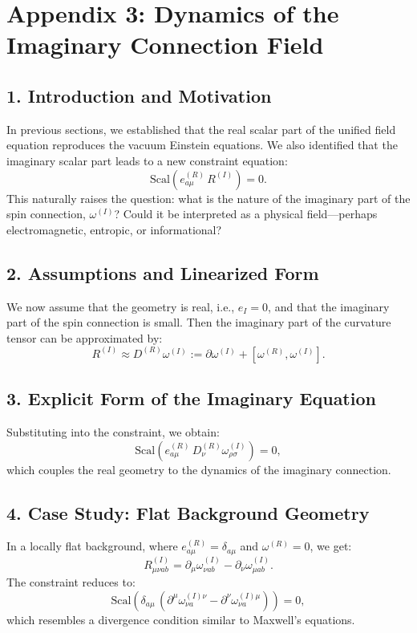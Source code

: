 
\section*{Appendix 3: Dynamics of the Imaginary Connection Field}

\subsection*{1. Introduction and Motivation}

In previous sections, we established that the real scalar part of the unified field equation reproduces the vacuum Einstein equations. We also identified that the imaginary scalar part leads to a new constraint equation:
\[
\text{Scal}\left(e^{(R)}_{a\mu} \, R^{(I)}\right) = 0.
\]
This naturally raises the question: what is the nature of the imaginary part of the spin connection, $\omega^{(I)}$? Could it be interpreted as a physical field—perhaps electromagnetic, entropic, or informational?

\subsection*{2. Assumptions and Linearized Form}

We now assume that the geometry is real, i.e., $e_I = 0$, and that the imaginary part of the spin connection is small. Then the imaginary part of the curvature tensor can be approximated by:
\[
R^{(I)} \approx D^{(R)} \omega^{(I)} := \partial \omega^{(I)} + [\omega^{(R)}, \omega^{(I)}].
\]

\subsection*{3. Explicit Form of the Imaginary Equation}

Substituting into the constraint, we obtain:
\[
\text{Scal}\left(e^{(R)}_{a\mu} \, D^{(R)}_\nu \omega^{(I)}_{\rho\sigma}\right) = 0,
\]
which couples the real geometry to the dynamics of the imaginary connection.

\subsection*{4. Case Study: Flat Background Geometry}

In a locally flat background, where $e^{(R)}_{a\mu} = \delta_{a\mu}$ and $\omega^{(R)} = 0$, we get:
\[
R^{(I)}_{\mu\nu ab} = \partial_\mu \omega^{(I)}_{\nu ab} - \partial_\nu \omega^{(I)}_{\mu ab}.
\]
The constraint reduces to:
\[
\text{Scal}\left( \delta_{a\mu} \, (\partial^\mu \omega^{(I)\nu}_{\nu a} - \partial^\nu \omega^{(I)\mu}_{\nu a}) \right) = 0,
\]
which resembles a divergence condition similar to Maxwell’s equations.

